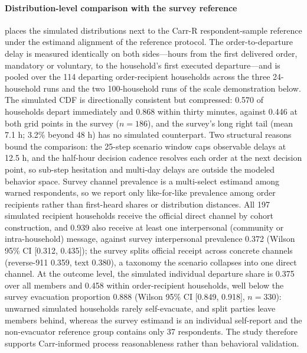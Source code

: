 \documentclass[journal]{IEEEtran}
\begin{document}
\paragraph{Distribution-level comparison with the survey reference}
 places the simulated distributions next to the Carr-R
respondent-sample reference under the estimand alignment of the
reference protocol. The order-to-departure delay is measured identically on
both sides---hours from the first delivered order, mandatory or voluntary, to
the household's first executed departure---and is pooled over the 114
departing order-recipient households across the three 24-household runs and
the two 100-household runs of the scale demonstration below. The simulated CDF
is directionally consistent but compressed: 0.570 of households depart
immediately and 0.868 within thirty minutes, against 0.446 at both grid
points in the survey ($n=186$), and the survey's long right tail (mean 7.1 h;
3.2\% beyond 48 h) has no simulated counterpart. Two structural reasons bound
the comparison: the 25-step scenario window caps observable delays at 12.5 h,
and the half-hour decision cadence resolves each order at the next decision
point, so sub-step hesitation and multi-day delays are outside the modeled
behavior space. Survey channel prevalence
is a multi-select estimand among warned respondents, so we report only
like-for-like prevalence among order recipients rather than first-heard shares
or distribution distances. All 197 simulated recipient households receive the
official direct
channel by cohort construction, and 0.939 also receive at least one
interpersonal (community or intra-household) message, against survey
interpersonal prevalence 0.372 (Wilson 95\% CI [0.312, 0.435]); the survey
splits official receipt across concrete channels (reverse-911 0.359, text
0.380), a taxonomy the scenario collapses into one direct channel. At the
outcome level, the simulated individual departure share is 0.375 over all
members and 0.458 within order-recipient households, well below the survey
evacuation proportion 0.888 (Wilson 95\% CI [0.849, 0.918], $n=330$): unwarned
simulated households rarely self-evacuate, and split parties leave members
behind, whereas the survey estimand is an individual self-report and the
non-evacuator reference group contains only 37 respondents. The study
therefore supports Carr-informed process reasonableness rather than behavioral
validation.
\end{document}
